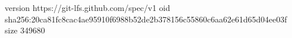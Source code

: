 version https://git-lfs.github.com/spec/v1
oid sha256:20ca81fc8cac4ae95910f6988b52de2b378156c55860c6aa62e61d65d04ee03f
size 349680
